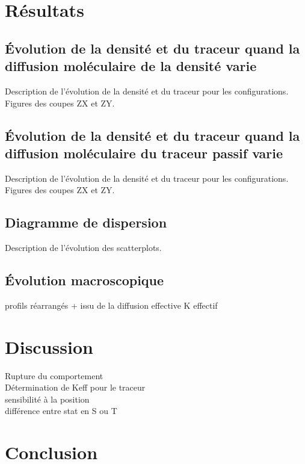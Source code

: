 \documentclass[a4paper,12pt]{article}
\begin{document}
\section{Résultats}

    \subsection{Évolution de la densité et du traceur quand la diffusion moléculaire de la densité varie}
    
    Description de l'évolution de la densité et du traceur pour les configurations.
    Figures des coupes ZX et ZY.
    
    
    \subsection{Évolution de la densité et du traceur quand la diffusion moléculaire du traceur passif varie}
 
    Description de l'évolution de la densité et du traceur pour les configurations.
    Figures des coupes ZX et ZY.
    
    
    \subsection{Diagramme de dispersion}
    
    Description de l'évolution des scatterplots. 
    
    
    \subsection{Évolution macroscopique}
    
    profils réarrangés + issu de la diffusion effective
    K effectif




\section{Discussion}

Rupture du comportement \\
Détermination de Keff pour le traceur \\
sensibilité à la position \\
différence entre stat en S ou T


\section{Conclusion}



\end{document}
